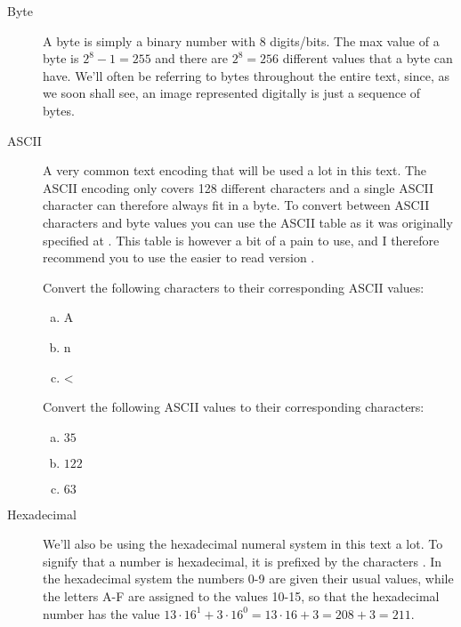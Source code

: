 \begin{description}
\item[Byte] A byte is simply a binary number with 8 digits/bits. The
  max value of a byte is $2^8 - 1 = 255$ and there are $2^8 = 256$
  different values that a byte can have. We'll often be referring to
  bytes throughout the entire text, since, as we soon shall see, an
  image represented digitally is just a sequence of bytes.

\item[ASCII] A very common text encoding that will be used a lot in
  this text. The ASCII encoding only covers 128 different characters
  and a single ASCII character can therefore always fit in a byte. To
  convert between ASCII characters and byte values you can use the
  ASCII table as it was originally specified at \cite{rfc20}. This
  table is however a bit of a pain to use, and I therefore recommend
  you to use the easier to read version \cite{ascii_table_descr}.

  \begin{Exercise}[label={ascii-to-num}]
    Convert the following characters to their corresponding ASCII
    values:

    \begin{enumerate}[(a)]
    \item A
    \item n
    \item <
    \end{enumerate}
  \end{Exercise}

  \begin{Exercise}[label={num-to-ascii}]
    Convert the following ASCII values to their corresponding characters:
    \begin{enumerate}[(a)]
    \item $35$
    \item $122$
    \item $63$
    \end{enumerate}
  \end{Exercise}

\item[Hexadecimal] We'll also be using the hexadecimal numeral system
  in this text a lot. To signify that a number is hexadecimal, it is
  prefixed by the characters \hex{}. In the hexadecimal system the
  numbers 0-9 are given their usual values, while the letters A-F are
  assigned to the values 10-15, so that the hexadecimal number
   has the value $13 \cdot 16^1 + 3 \cdot 16^0 = 13 \cdot 16 +
  3 = 208 + 3 = 211$.


\end{description}
